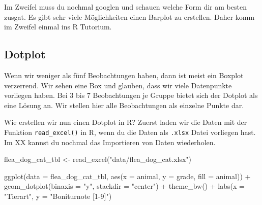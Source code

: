 \documentclass[
  letterpaper,
]{scrbook}
\newenvironment{Shaded}{\begin{snugshade}}{\end{snugshade}}
\newcommand{\AttributeTok}[1]{\textcolor[rgb]{0.40,0.45,0.13}{#1}}
\newcommand{\FunctionTok}[1]{\textcolor[rgb]{0.28,0.35,0.67}{#1}}
\newcommand{\NormalTok}[1]{\textcolor[rgb]{0.00,0.23,0.31}{#1}}
\newcommand{\OtherTok}[1]{\textcolor[rgb]{0.00,0.23,0.31}{#1}}
\newcommand{\SpecialCharTok}[1]{\textcolor[rgb]{0.37,0.37,0.37}{#1}}
\newcommand{\StringTok}[1]{\textcolor[rgb]{0.13,0.47,0.30}{#1}}
\begin{document}
Im Zweifel muss du nochmal googlen und schauen welche Form dir am besten
zusgat. Es gibt sehr viele Möglichkeiten einen Barplot zu erstellen.
Daher komm im Zweifel einmal ins R Tutorium.

\hypertarget{sec-eda-dotplot}{%
\subsection{Dotplot}\label{sec-eda-dotplot}}

Wenn wir weniger als fünf Beobachtungen haben, dann ist meist ein
Boxplot verzerrend. Wir sehen eine Box und glauben, dass wir viele
Datenpunkte vorliegen haben. Bei 3 bis 7 Beobachtungen je Gruppe bietet
sich der Dotplot als eine Lösung an. Wir stellen hier alle Beobachtungen
als einzelne Punkte dar.

Wie erstellen wir nun einen Dotplot in R? Zuerst laden wir die Daten mit
der Funktion \texttt{read\_excel()} in R, wenn du die Daten als
\texttt{.xlsx} Datei vorliegen hast. Im XX kannst du nochmal das
Importieren von Daten wiederholen.

\begin{Shaded}
\begin{Highlighting}[]
\NormalTok{flea\_dog\_cat\_tbl }\OtherTok{\textless{}{-}} \FunctionTok{read\_excel}\NormalTok{(}\StringTok{"data/flea\_dog\_cat.xlsx"}\NormalTok{)}
\end{Highlighting}
\end{Shaded}

\begin{Shaded}
\begin{Highlighting}[]
\FunctionTok{ggplot}\NormalTok{(}\AttributeTok{data =}\NormalTok{ flea\_dog\_cat\_tbl, }\FunctionTok{aes}\NormalTok{(}\AttributeTok{x =}\NormalTok{ animal, }\AttributeTok{y =}\NormalTok{ grade,}
                                    \AttributeTok{fill =}\NormalTok{ animal)) }\SpecialCharTok{+}
  \FunctionTok{geom\_dotplot}\NormalTok{(}\AttributeTok{binaxis =} \StringTok{"y"}\NormalTok{, }\AttributeTok{stackdir =} \StringTok{"center"}\NormalTok{) }\SpecialCharTok{+}
  \FunctionTok{theme\_bw}\NormalTok{() }\SpecialCharTok{+}
  \FunctionTok{labs}\NormalTok{(}\AttributeTok{x =} \StringTok{"Tierart"}\NormalTok{, }\AttributeTok{y =} \StringTok{"Boniturnote [1{-}9]"}\NormalTok{) }
\end{Highlighting}
\end{Shaded}
\end{document}
